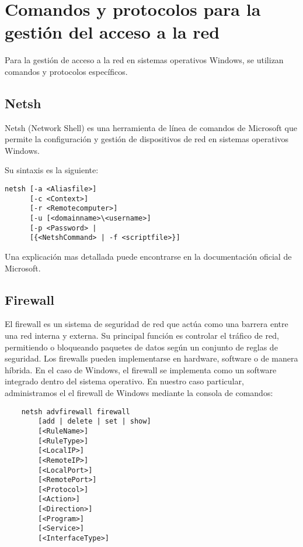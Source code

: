 \section{Comandos y protocolos para la gestión del acceso a la red}
\label{sec:comandos-y-protocolos-para-la-gestion-del-acceso-a-la-red}

Para la gestión de acceso a la red en sistemas operativos Windows, se utilizan comandos y protocolos específicos.

\subsection{Netsh}\label{subsec:netsh}

Netsh (Network Shell) es una herramienta de línea de comandos de Microsoft que permite la configuración y gestión de
dispositivos de red en sistemas operativos Windows.

Su sintaxis es la siguiente:
\begin{verbatim}
netsh [-a <Aliasfile>]
      [-c <Context>]
      [-r <Remotecomputer>]
      [-u [<domainname>\<username>]
      [-p <Password> |
      [{<NetshCommand> | -f <scriptfile>}]
\end{verbatim}


Una explicación mas detallada puede encontrarse en la documentación oficial de
Microsoft\cite{microsoftNetsh}.

\subsection{Firewall}\label{subsec:firewall}

El firewall\cite{cloudflareFirewall} es un sistema de seguridad de red que actúa como una barrera entre una red interna y externa.
Su principal función es controlar el tráfico de red, permitiendo o bloqueando paquetes de datos según un conjunto
de reglas de seguridad.
Los firewalls pueden implementarse en hardware, software o de manera híbrida.
En el caso de Windows, el firewall se implementa como un software integrado dentro del sistema operativo.
En nuestro caso particular, administramos el el firewall de Windows mediante la consola de comandos:

\begin{verbatim}
	netsh advfirewall firewall
		[add | delete | set | show]
		[<RuleName>]
		[<RuleType>]
		[<LocalIP>]
		[<RemoteIP>]
		[<LocalPort>]
		[<RemotePort>]
		[<Protocol>]
		[<Action>]
		[<Direction>]
		[<Program>]
		[<Service>]
		[<InterfaceType>]
\end{verbatim}

